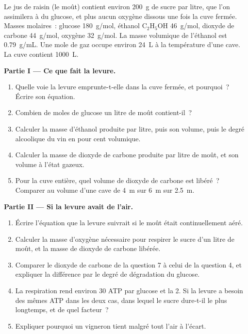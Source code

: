 \begin{problem}
\label{pb:g10:cell-metabolism:1}
Le jus de raisin (le moût) contient environ \qty{200}{g} de sucre par
litre, que l'on assimilera à du glucose, et plus aucun oxygène dissous une
fois la cuve fermée. Masses molaires~: glucose \qty{180}{g/mol},
éthanol $\mathrm{C_2H_5OH}$ \qty{46}{g/mol}, dioxyde de carbone
\qty{44}{g/mol}, oxygène \qty{32}{g/mol}. La masse volumique de
l'éthanol est \qty{0.79}{g/mL}. Une mole de gaz occupe environ
\qty{24}{L} à la température d'une cave. La cuve contient
\qty{1000}{L}.

\medskip
\noindent\textbf{Partie I --- Ce que fait la levure.}
\begin{enumerate}
  \item Quelle voie la levure emprunte-t-elle dans la cuve fermée, et
        pourquoi~? Écrire son équation.
  \item Combien de moles de glucose un litre de moût contient-il~?
  \item Calculer la masse d'éthanol produite par litre, puis son
        volume, puis le degré alcoolique du vin en pour cent
        volumique.
  \item Calculer la masse de dioxyde de carbone produite par litre de
        moût, et son volume à l'état gazeux.
  \item Pour la cuve entière, quel volume de dioxyde de carbone est
        libéré~? Comparer au volume d'une cave de \qty{4}{m} sur
        \qty{6}{m} sur \qty{2.5}{m}.
\end{enumerate}

\medskip
\noindent\textbf{Partie II --- Si la levure avait de l'air.}
\begin{enumerate}[resume]
  \item Écrire l'équation que la levure suivrait si le moût était
        continuellement aéré.
  \item Calculer la masse d'oxygène nécessaire pour respirer le sucre
        d'un litre de moût, et la masse de dioxyde de carbone libérée.
  \item Comparer le dioxyde de carbone de la question 7 à celui de la
        question 4, et expliquer la différence par le degré de
        dégradation du glucose.
  \item La respiration rend environ 30 ATP par glucose et la
         2. Si la levure a besoin des mêmes ATP dans les
        deux cas, dans lequel le sucre dure-t-il le plus longtemps, et
        de quel facteur~?
  \item Expliquer pourquoi un vigneron tient malgré tout l'air à
        l'écart.
\end{enumerate}


\end{problem}
